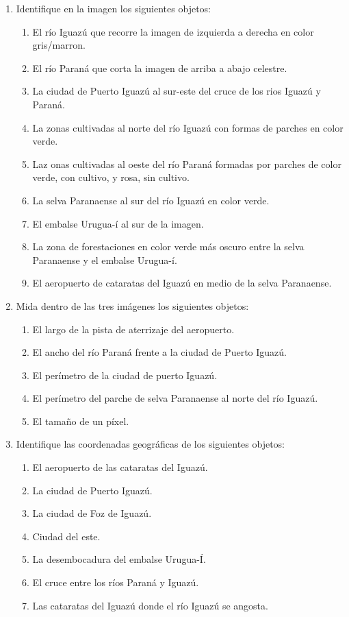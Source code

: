 \begin{enumerate}
  \item Identifique en la imagen los siguientes objetos:
  \begin{enumerate}
    \item El río Iguazú que recorre la imagen de izquierda a derecha en color gris/marron.
    \item El río Paraná que corta la imagen de arriba a abajo celestre.
    \item La ciudad de Puerto Iguazú al sur-este del cruce de los rios Iguazú y Paraná.
    \item La zonas cultivadas al norte del río Iguazú con formas de parches en color verde.
    \item Laz onas cultivadas al oeste del río Paraná formadas por parches de color verde, con cultivo, y rosa, sin cultivo.
    \item La selva Paranaense al sur del río Iguazú en color verde.
    \item El embalse Urugua-í al sur de la imagen.
    \item La zona de forestaciones en color verde más oscuro entre la selva Paranaense y el embalse Urugua-í.
    \item El aeropuerto de cataratas del Iguazú en medio de la selva Paranaense.
  \end{enumerate}

  \item Mida dentro de las tres imágenes los siguientes objetos:
  \begin{enumerate}
    \item El largo de la pista de aterrizaje del aeropuerto.
    \item El ancho del río Paraná frente a la ciudad de Puerto Iguazú.
    \item El perímetro de la ciudad de puerto Iguazú.
    \item El perímetro del parche de selva Paranaense al norte del río Iguazú.
    \item El tamaño de un píxel.
  \end{enumerate}

  \item Identifique las coordenadas geográficas de los siguientes objetos:
  \begin{enumerate}
    \item El aeropuerto de las cataratas del Iguazú.
    \item La ciudad de Puerto Iguazú.
    \item La ciudad de Foz de Iguazú.
    \item Ciudad del este.
    \item La desembocadura del embalse Urugua-Í.
    \item El cruce entre los ríos Paraná y Iguazú.
    \item Las cataratas del Iguazú donde el río Iguazú se angosta.
  \end{enumerate}

\end{enumerate}
